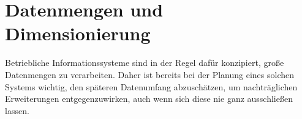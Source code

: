 \section{Datenmengen und Dimensionierung}

Betriebliche Informationssysteme sind in der Regel dafür konzipiert, große Datenmengen zu verarbeiten. Daher ist bereits bei der Planung eines solchen Systems wichtig, den späteren Datenumfang abzuschätzen, um nachträglichen Erweiterungen entgegenzuwirken, auch wenn sich diese nie ganz ausschließen lassen.


